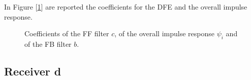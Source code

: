 \documentclass[a4paper, 12pt]{report}
\begin{document}
In Figure [\ref{rec_c}] are reported the coefficients for the DFE and the overall impulse response.
\begin{figure}[H]
	\centering
	\quad
	\caption{Coefficients of the FF filter $c$, of the overall impulse response $\psi_i$ and of the FB filter $b$.}\label{rec_c}
\end{figure}

\clearpage
\subsection*{Receiver d}
\end{document}
